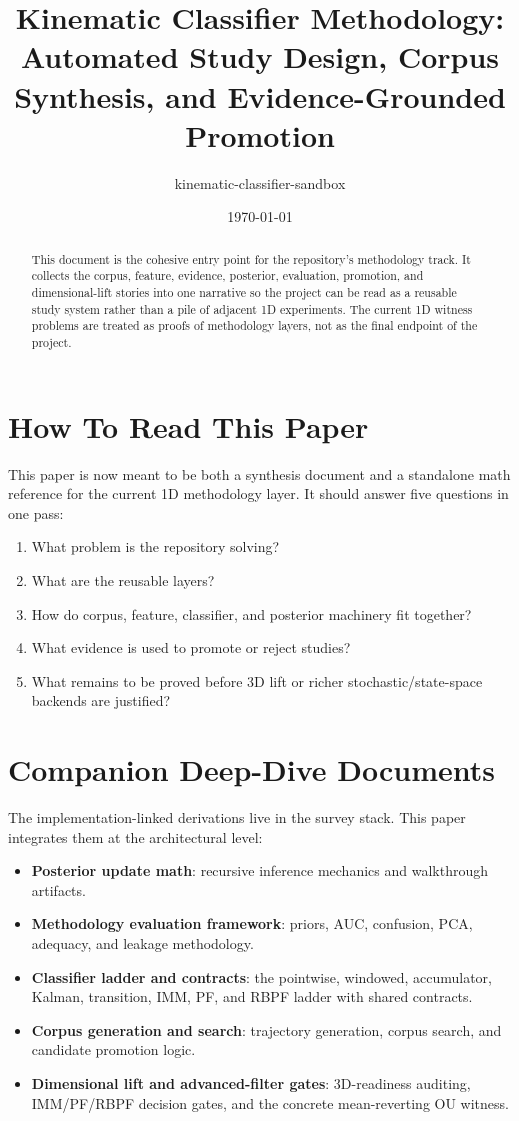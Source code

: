 \documentclass[11pt]{article}
\title{Kinematic Classifier Methodology: Automated Study Design, Corpus Synthesis, and Evidence-Grounded Promotion}
\author{kinematic-classifier-sandbox}
\date{\today}
\begin{document}
\maketitle

\begin{abstract}
This document is the cohesive entry point for the repository's methodology track. It collects the corpus, feature, evidence, posterior, evaluation, promotion, and dimensional-lift stories into one narrative so the project can be read as a reusable study system rather than a pile of adjacent 1D experiments. The current 1D witness problems are treated as proofs of methodology layers, not as the final endpoint of the project.
\end{abstract}

\section{How To Read This Paper}
This paper is now meant to be both a synthesis document and a standalone math reference for the current 1D methodology layer. It should answer five questions in one pass:
\begin{enumerate}[leftmargin=1.5em]
  \item What problem is the repository solving?
  \item What are the reusable layers?
  \item How do corpus, feature, classifier, and posterior machinery fit together?
  \item What evidence is used to promote or reject studies?
  \item What remains to be proved before 3D lift or richer stochastic/state-space backends are justified?
\end{enumerate}

\section{Companion Deep-Dive Documents}
The implementation-linked derivations live in the survey stack. This paper integrates them at the architectural level:
\begin{itemize}
  \item \textbf{Posterior update math}: recursive inference mechanics and walkthrough artifacts.
  \item \textbf{Methodology evaluation framework}: priors, AUC, confusion, PCA, adequacy, and leakage methodology.
  \item \textbf{Classifier ladder and contracts}: the pointwise, windowed, accumulator, Kalman, transition, IMM, PF, and RBPF ladder with shared contracts.
  \item \textbf{Corpus generation and search}: trajectory generation, corpus search, and candidate promotion logic.
  \item \textbf{Dimensional lift and advanced-filter gates}: 3D-readiness auditing, IMM/PF/RBPF decision gates, and the concrete mean-reverting OU witness.
\end{itemize}
\end{document}
